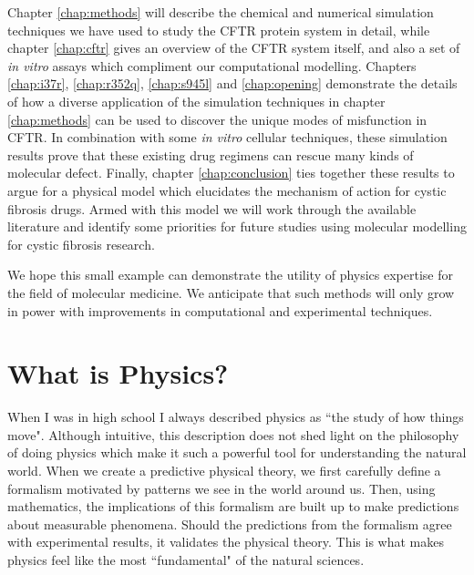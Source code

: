 Chapter \ref{chap:methods} will describe the chemical and numerical simulation techniques we have used to study the CFTR protein system in detail, while chapter \ref{chap:cftr} gives an overview of the CFTR system itself, and also a set of \textit {in vitro} assays which compliment our computational modelling.  Chapters \ref{chap:i37r}, \ref{chap:r352q}, \ref{chap:s945l} and \ref{chap:opening} demonstrate the details of how a diverse application of the simulation techniques in chapter \ref{chap:methods} can be used to discover the unique modes of misfunction in CFTR. In combination with some \textit {in vitro} cellular techniques, these simulation results prove that these existing drug regimens can rescue many kinds of molecular defect. Finally, chapter \ref{chap:conclusion} ties together these results to argue for a physical model which elucidates the mechanism of action for cystic fibrosis drugs. Armed with this model we will work through the available literature and identify some priorities for future studies using molecular modelling for cystic fibrosis research. 


We hope this small example can demonstrate the utility of physics expertise for the field of molecular medicine. We anticipate that such methods will only grow in power with improvements in computational and experimental techniques.

\section{What is Physics?}
\label{WIP}
When I was in high school I always described physics as ``the study of how things move". Although intuitive, this description does not shed light on the philosophy of doing physics which make it such a powerful tool for understanding the natural world. When we create a predictive physical theory, we first carefully define a formalism motivated by patterns we see in the world around us. Then, using mathematics, the implications of this formalism are built up to make predictions about measurable phenomena. Should the predictions from the formalism agree with experimental results, it validates the physical theory. This is what makes physics feel like the most ``fundamental" of the natural sciences.

